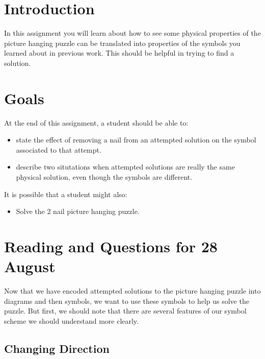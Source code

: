 \documentclass[12pt,letterpaper]{article}
\theoremstyle{definition}
\begin{document}
\setlength{\parskip}{1ex plus 0.5ex minus 0.2ex}
\setlength{\parindent}{0pt}

\pagestyle{fancy}
\cfoot{}

\section*{Introduction}
In this assignment you will learn about how to see some physical properties of the picture hanging puzzle can be translated into properties of the symbols you learned about in previous work.
This should be helpful in trying to find a solution.

\section*{Goals}
At the end of this assignment, a student should be able to:
\begin{itemize}
\item state the effect of removing a nail from an attempted solution on the symbol associated to that attempt.
\item describe two situtations when attempted solutions are really the same physical solution, even though the symbols are different.
\end{itemize}
It is possible that a student might also:
\begin{itemize}
\item Solve the 2 nail picture hanging puzzle.
\end{itemize}

\section*{Reading and Questions for 28 August}

Now that we have encoded attempted solutions to the picture hanging puzzle into diagrams and then symbols, we want to use these symbols to help us solve the puzzle.
But first, we should note that there are several features of our symbol scheme we should understand more clearly.

\subsection*{Changing Direction}
\end{document}
